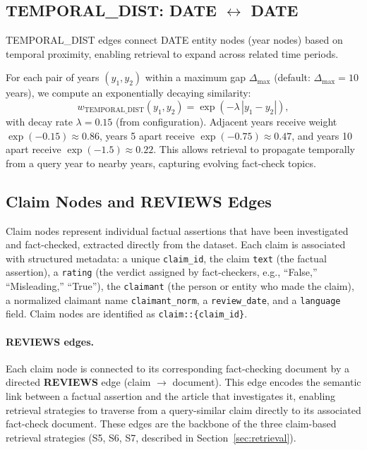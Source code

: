 \documentclass[10pt]{article}
\begin{document}
\subsection{TEMPORAL\_DIST: DATE $\leftrightarrow$ DATE}

TEMPORAL\_DIST edges connect DATE entity nodes (year nodes) based on temporal
proximity, enabling retrieval to expand across related time periods.

For each pair of years $(y_1, y_2)$ within a maximum gap $\Delta_{\max}$
(default: $\Delta_{\max} = 10$ years), we compute an exponentially decaying
similarity:
\[
w_{\text{TEMPORAL\_DIST}}(y_1, y_2) = \exp\left(-\lambda \, |y_1 - y_2|\right),
\]
with decay rate $\lambda = 0.15$ (from configuration). Adjacent years receive
weight $\exp(-0.15) \approx 0.86$, years 5 apart receive $\exp(-0.75) \approx 0.47$,
and years 10 apart receive $\exp(-1.5) \approx 0.22$. This allows retrieval to
propagate temporally from a query year to nearby years, capturing evolving
fact-check topics.


\subsection{Claim Nodes and REVIEWS Edges}

Claim nodes represent individual factual assertions that have been investigated and fact-checked, extracted directly from the dataset. Each claim is associated with structured metadata: a unique \texttt{claim\_id}, the claim \texttt{text} (the factual assertion), a \texttt{rating} (the verdict assigned by fact-checkers, e.g., ``False,'' ``Misleading,'' ``True''), the \texttt{claimant} (the person or entity who made the claim), a normalized claimant name \texttt{claimant\_norm}, a \texttt{review\_date}, and a \texttt{language} field. Claim nodes are identified as \texttt{claim::\{claim\_id\}}.

\paragraph{REVIEWS edges.} Each claim node is connected to its corresponding fact-checking document by a directed \textbf{REVIEWS} edge (claim $\to$ document). This edge encodes the semantic link between a factual assertion and the article that investigates it, enabling retrieval strategies to traverse from a query-similar claim directly to its associated fact-check document. These edges are the backbone of the three claim-based retrieval strategies (S5, S6, S7, described in Section~\ref{sec:retrieval}).
\end{document}
